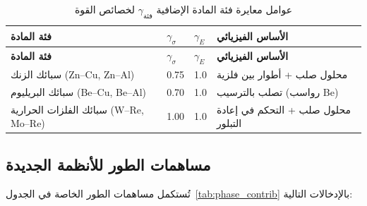 \documentclass[12pt,a4paper]{article}
\begin{document}
	\begin{longtable}{p{3.5cm} p{2.5cm} p{2.5cm} p{5cm}}
		\caption{عوامل معايرة فئة المادة الإضافية \(\gamma_{\text{فئة}}\) لخصائص القوة}\label{tab:gamma_class_extended}\\
		\toprule
		\textbf{فئة المادة} & \(\gamma_{\sigma}\) & \(\gamma_{E}\) & \textbf{الأساس الفيزيائي} \\
		\midrule
		\endfirsthead
		\toprule
		\textbf{فئة المادة} & \(\gamma_{\sigma}\) & \(\gamma_{E}\) & \textbf{الأساس الفيزيائي} \\
		\midrule
		\endhead
		سبائك الزنك (Zn–Cu, Zn–Al) & 0.75 & 1.0 & محلول صلب + أطوار بين فلزية \\
		سبائك البريليوم (Be–Cu, Be–Al) & 0.70 & 1.0 & تصلب بالترسيب (رواسب Be) \\
		سبائك الفلزات الحرارية (W–Re, Mo–Re) & 1.00 & 1.0 & محلول صلب + التحكم في إعادة التبلور \\
		\bottomrule
	\end{longtable}
	
	\subsection*{مساهمات الطور للأنظمة الجديدة}
	تُستكمل مساهمات الطور الخاصة في الجدول~\ref{tab:phase_contrib} بالإدخالات التالية:
	
\end{document}
